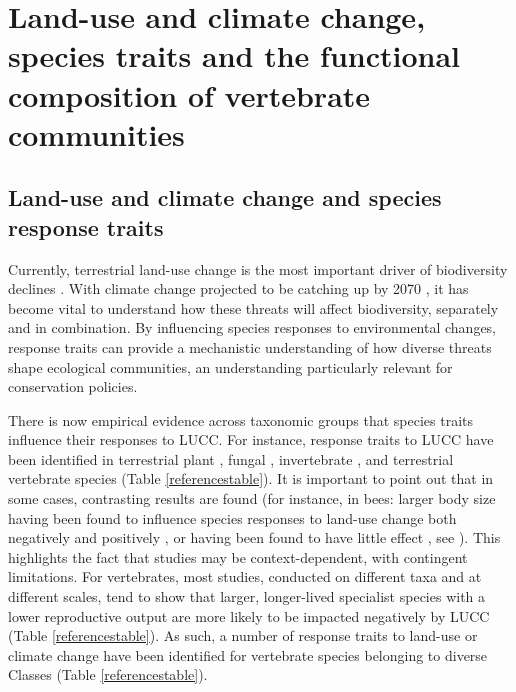 \section{Land-use and climate change, species traits and the functional composition of vertebrate communities}

\subsection{Land-use and climate change and species response traits}

Currently, terrestrial land-use change is the most important driver of biodiversity declines \citep{Newbold2015, Chaudhary2016, Maxwell2016}.  With climate change projected to be catching up by 2070 \citep{Newbold2018}, it has become vital to understand how these threats will affect biodiversity, separately and in combination. By influencing species responses to environmental changes, response traits can provide a mechanistic understanding of how diverse threats shape ecological communities, an understanding particularly relevant for conservation policies. 

There is now empirical evidence across taxonomic groups that species traits influence their responses to LUCC. For instance, response traits to LUCC have been identified in terrestrial plant \citep{Diaz2001}, fungal \citep{Koide2013}, invertebrate \citep{Williams2010, Hall2019}, and terrestrial vertebrate species (Table \ref{referencestable}).
It is important to point out that in some cases, contrasting results are found (for instance, in bees: larger body size having been found to influence species responses to land-use change both negatively \citep{Larsen2005} and positively \citep{Depalma2015}, or having been found to have little effect \citep{Williams2010, Forrest2015}, see \citet{Bartomeus2018}). This highlights the fact that studies may be context-dependent, with contingent limitations. For vertebrates, most studies, conducted on different taxa and at different scales, tend to show that larger, longer-lived specialist species with a lower reproductive output are more likely to be impacted negatively by LUCC (Table \ref{referencestable}). As such, a number of response traits to land-use or climate change have been identified for vertebrate species belonging to diverse Classes (Table \ref{referencestable}).

